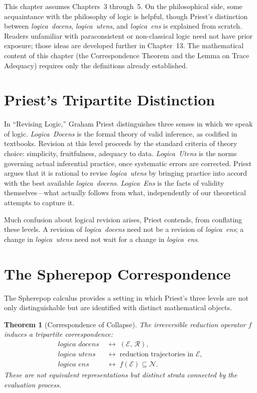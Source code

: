 \documentclass[12pt, oneside]{amsbook}
\theoremstyle{plain}
\newtheorem{theorem}{Theorem}[section]
\theoremstyle{definition}
\theoremstyle{remark}
\newcommand{\Expr}{\mathcal{E}}
\newcommand{\NF}{\mathcal{N}}
\newcommand{\evalf}{f}
\newcommand{\ruleR}{\mathcal{R}}
\newcommand{\docens}{\textit{logica~docens}}
\newcommand{\utens}{\textit{logica~utens}}
\newcommand{\ens}{\textit{logica~ens}}
\newcommand{\Docens}{\textit{Logica~Docens}}
\newcommand{\Utens}{\textit{Logica~Utens}}
\newcommand{\Ens}{\textit{Logica~Ens}}
\begin{document}
This chapter assumes Chapters~3 through~5. On the philosophical side, some acquaintance with the philosophy of logic is helpful, though Priest\textquoteright s distinction between \docens{}, \utens{}, and \ens{} is explained from scratch. Readers unfamiliar with paraconsistent or non-classical logic need not have prior exposure; those ideas are developed further in Chapter~13. The mathematical content of this chapter (the Correspondence Theorem and the Lemma on Trace Adequacy) requires only the definitions already established.

\section{Priest's Tripartite Distinction}
\label{sec:priest:three}

In ``Revising Logic,'' Graham Priest distinguishes three senses in which we
speak of logic. \Docens{} is the formal theory of valid inference, as codified
in textbooks. Revision at this level proceeds by the standard criteria of theory
choice: simplicity, fruitfulness, adequacy to data. \Utens{} is the norms
governing actual inferential practice, once systematic errors are corrected.
Priest argues that it is rational to revise \utens{} by bringing practice into
accord with the best available \docens{}. \Ens{} is the facts of validity
themselves---what actually follows from what, independently of our theoretical
attempts to capture it.

Much confusion about logical revision arises, Priest contends, from conflating
these levels. A revision of \docens{} need not be a revision of \ens{}; a change
in \utens{} need not wait for a change in \ens{}.

\section{The Spherepop Correspondence}
\label{sec:priest:correspondence}

The Spherepop calculus provides a setting in which Priest's three levels are not
only distinguishable but are identified with distinct mathematical objects.

\begin{theorem}[Correspondence of Collapse]
\label{thm:correspondence}
  The irreversible reduction operator $\evalf$ induces a tripartite
  correspondence:
  \begin{align*}
    \docens{} &\;\longleftrightarrow\; (\Expr,\, \ruleR), \\
    \utens{}  &\;\longleftrightarrow\; \text{reduction trajectories in }
                \Expr, \\
    \ens{}    &\;\longleftrightarrow\; \evalf(\Expr) \subseteq \NF.
  \end{align*}
  These are not equivalent representations but distinct strata connected by
  the evaluation process.
\end{theorem}
\end{document}
